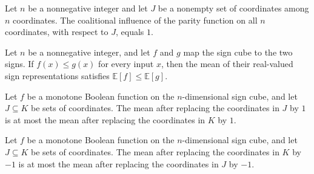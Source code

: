 \begin{theorem}
\label{FABL.coalitionalInfluence_parity_univ}
\leanok
{}
Let $n$ be a nonnegative integer and let $J$ be a nonempty set of coordinates among $n$
coordinates. The coalitional influence of the parity function on all $n$ coordinates,
with respect to $J$, equals $1$.
\end{theorem}

\begin{theorem}
\label{FABL.mean_toReal_mono}
\leanok
{}
Let $n$ be a nonnegative integer, and let $f$ and $g$ map the sign cube to the two
signs. If $f(x)\le g(x)$ for every input $x$, then the mean of their real-valued sign
representations satisfies $\mathbb E[f]\le\mathbb E[g]$.
\end{theorem}

\begin{theorem}
\label{FABL.mean_bribeFunction_mono_set_one}
\leanok
{}
Let $f$ be a monotone Boolean function on the $n$-dimensional sign cube, and let
$J\subseteq K$ be sets of coordinates. The mean after replacing the coordinates in $J$
by $1$ is at most the mean after replacing the coordinates in $K$ by $1$.
\end{theorem}

\begin{theorem}
\label{FABL.mean_bribeFunction_mono_set_neg_one}
\leanok
{}
Let $f$ be a monotone Boolean function on the $n$-dimensional sign cube, and let
$J\subseteq K$ be sets of coordinates. The mean after replacing the coordinates in $K$
by $-1$ is at most the mean after replacing the coordinates in $J$ by $-1$.
\end{theorem}

